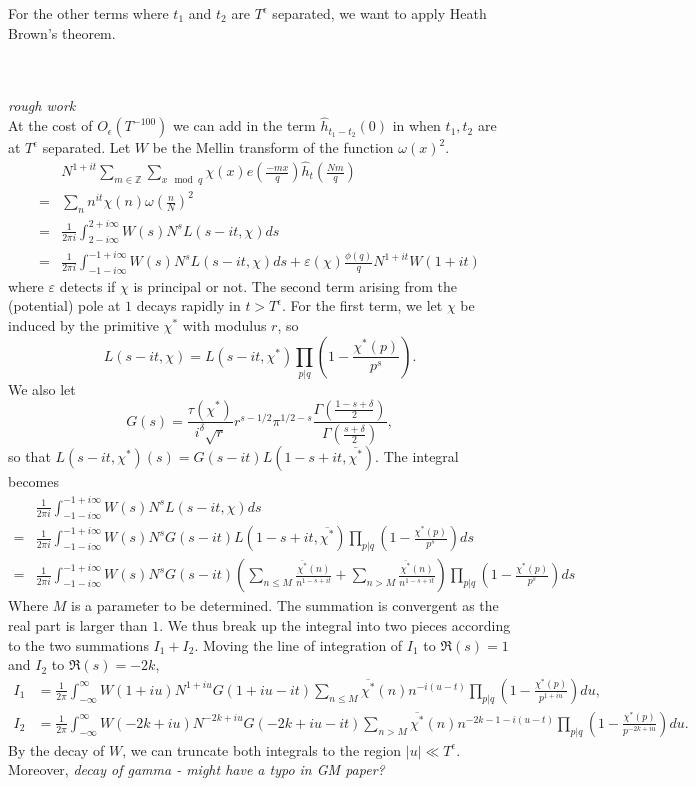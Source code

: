 For the other terms where $t_1$ and $t_2$ are $T^\epsilon$ separated, we want to apply Heath Brown's theorem.

\ 
\\ \ 
\\
\textit{rough work}\ \\
At the cost of $O_\epsilon(T^{-100})$ we can add in the term $\hat{h}_{t_1-t_2}(0)$ in when $t_1,t_2$ are at $T^\epsilon$ separated. Let $W$ be the Mellin transform of the function $\omega(x)^2$.
\begin{align*}
    &N^{1+it}\sum_{m\in \mathbb{Z}} \sum_{x \mod q}\chi(x) e\left(\frac{-mx}{q}\right)
    \hat{h}_{t}\left(\frac{Nm}{q}\right) \\
    =& \sum_{n} n^{it}\chi(n)\omega\left(\frac{n}{N}\right)^2\\
    =& \frac{1}{2\pi i}\int_{2-i\infty}^{2+i\infty}W(s)N^sL(s-it,\chi) ds\\
    =& \frac{1}{2\pi i}\int_{-1-i\infty}^{-1+i\infty}W(s)N^sL(s-it,\chi) ds + \varepsilon(\chi)\frac{\phi(q)}{q}N^{1+it}W(1+it)
\end{align*}
where $\varepsilon$ detects if $\chi$ is principal or not. The second term arising from the (potential) pole at $1$ decays rapidly in $t>T^\epsilon$.
For the first term, we let $\chi$ be induced by the primitive $\chi^*$ with modulus $r$, so\[
    L(s-it,\chi)=L(s-it,\chi^*)\prod_{p|q} \left(1-\frac{\chi^*(p)}{p^s}\right).
\]
We also let \[
    G(s) =\frac{\tau(\chi^*)}{i^\delta\sqrt{r}}r^{s-1/2}\pi^{1/2-s}\frac{\Gamma(\frac{1-s+\delta}{2})}{\Gamma(\frac{s+\delta}{2})},
\]
so that $L(s-it,\chi^*)(s) = G(s-it)L(1-s+it,\overline{\chi^*})$. The integral becomes
\begin{align*}
   &\frac{1}{2\pi i}\int_{-1-i\infty}^{-1+i\infty}W(s)N^sL(s-it,\chi) ds \\=&\frac{1}{2\pi i}
   \int_{-1-i\infty}^{-1+i\infty}W(s)N^s
    G(s-it) L(1-s+it,\overline{\chi^*}) \prod_{p|q} \left(1-\frac{\chi^*(p)}{p^s}\right)ds\\
    =& \frac{1}{2\pi i}\int_{-1-i\infty}^{-1+i\infty}W(s)N^s
    G(s-it) 
    \left(\sum_{n\leq M}\frac{\overline{\chi^*}(n)}{n^{1-s+it}}+
    \sum_{n> M}\frac{\overline{\chi^*}(n)}{n^{1-s+it}}
   \right) \prod_{p|q} \left(1-\frac{\chi^*(p)}{p^s}\right)ds
\end{align*}
Where $M$ is a parameter to be determined. The summation is convergent as the real part is larger than $1$.
We thus break up the integral into two pieces according to the two summations $I_1+I_2$. Moving the line of integration of $I_1$ to $\Re(s)=1$ and $I_2$ to $\Re(s)=-2k$,
\begin{align*}
        I_1&= \frac{1}{2\pi}\int_{-\infty}^{\infty}W(1+iu)N^{1+iu}G(1+iu-it)\sum_{n\leq M}\overline{\chi^*}(n)n^{-i(u-t)}\prod_{p|q} \left(1-\frac{\chi^*(p)}{p^{1+iu}}\right)du,\\
        I_2&= \frac{1}{2\pi}\int_{-\infty}^{\infty}W(-2k+iu)N^{-2k+iu}G(-2k+iu-it)\sum_{n> M}\overline{\chi^*}(n)n^{-2k-1-i(u-t)}\prod_{p|q} \left(1-\frac{\chi^*(p)}{p^{-2k+iu}}\right)du.
\end{align*}
By the decay of $W$, we can truncate both integrals to the region $|u|\ll T^\epsilon$.
Moreover, \textit{decay of gamma - might have a typo in GM paper?}
